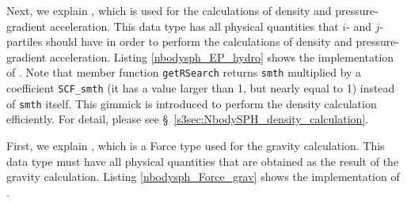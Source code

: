 \ifCpp %

\endifCpp
\ifFtn %

\endifFtn
\ifC %

\endifC


Next, we explain , which is used for the calculations of density and pressure-gradient acceleration. This data type has all physical quantities that $i$- and $j$-partiles should have in order to perform the calculations of density and pressure-gradient acceleration. Listing \ref{nbodysph_EP_hydro} shows the implementation of . 
\ifCpp %
Note that member function \texttt{getRSearch} returns \texttt{smth} multiplied by a coefficient \texttt{SCF\_smth} (it has a value larger than 1, but nearly equal to 1) instead of \texttt{smth} itself. This gimmick is introduced to perform the density calculation efficiently. For detail, please see \S~\ref{s3sec:NbodySPH_density_calculation}.
\endifCpp

\ifCpp %

\endifCpp
\ifFtn %

\endifFtn
\ifC %

\endifC

First, we explain , which is a \textsf{Force} type used for the gravity calculation. This data type must have all physical quantities that are obtained as the result of the gravity calculation. Listing \ref{nbodysph_Force_grav} shows the implementation of .

